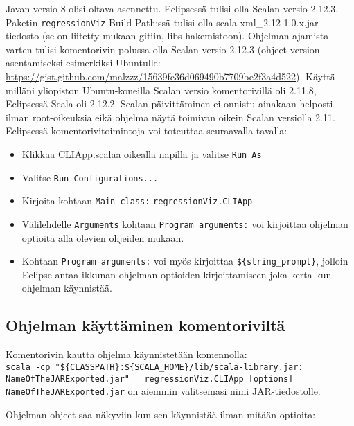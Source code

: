 \documentclass{article}
\begin{document}
    Javan versio 8 olisi oltava asennettu. Eclipsessä tulisi olla Scalan versio 2.12.3. 
	Paketin \texttt{regressionViz} Build Path:ssä tulisi olla scala-xml\_2.12-1.0.x.jar 
	-tiedosto (se on liitetty mukaan gitiin, libs-hakemistoon). Ohjelman ajamista varten 
	tulisi komentorivin polussa olla Scalan versio 2.12.3 (ohjeet version asentamiseksi 
	esimerkiksi Ubuntulle: \\ \url{https://gist.github.com/malzzz/15639fc36d069490b7709be2f3a4d522}). 
	Käyttä-milläni yliopiston Ubuntu-koneilla Scalan versio komentorivillä oli 2.11.8, 
	Eclipsessä Scala oli 2.12.2. Scalan päivittäminen ei onnistu ainakaan helposti ilman 
	root-oikeuksia eikä ohjelma näytä toimivan oikein Scalan versiolla 2.11. Eclipsessä 
	komentorivitoimintoja voi toteuttaa seuraavalla tavalla:

    \begin{itemize}
        \item Klikkaa CLIApp.scalaa oikealla napilla ja valitse \texttt{Run As}
        \item Valitse \texttt{Run Configurations...}
        \item Kirjoita kohtaan \texttt{Main class:} \texttt{regressionViz.CLIApp}
        \item Välilehdelle \texttt{Arguments} kohtaan \texttt{Program arguments:} voi 
		kirjoittaa ohjelman optioita alla olevien ohjeiden mukaan. 
        \item Kohtaan \texttt{Program arguments:} voi myös kirjoittaa 
		\texttt{\$\{string\_prompt\}}, jolloin Eclipse antaa ikkunan ohjelman 
		optioiden kirjoittamiseen joka kerta kun ohjelman käynnistää.
    \end{itemize}
    
    \subsection{Ohjelman käyttäminen komentoriviltä}
    Komentorivin kautta ohjelma käynnistetään komennolla: \\
    
    \texttt{scala -cp "\$\{CLASSPATH\}:\$\{SCALA\_HOME\}/lib/scala-library.jar:} \\
    \texttt{NameOfTheJARExported.jar" \, regressionViz.CLIApp [options]}
    \\
    
    \texttt{NameOfTheJARExported.jar} on aiemmin valitsemasi nimi JAR-tiedostolle. 
    
        Ohjelman ohjeet saa näkyviin kun sen käynnistää ilman mitään optioita: \\
    
\end{document}

